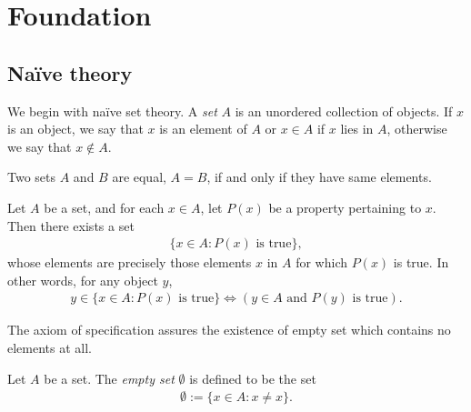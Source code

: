 
\chapter{Foundation}

\section{Na\"ive theory}

We begin with na\"ive set theory. A \emph{set} $A$ is an unordered collection of objects. If $x$ is an object, we say that $x$ is an element of $A$ or $x \in A$ if $x$ lies in $A$, otherwise we say that $x \notin A$.

\begin{axiom}
    Two sets $A$ and $B$ are equal, $A = B$, if and only if they have same elements.
\end{axiom}

\begin{axiom}
    Let $A$ be a set, and for each $x \in A$, let $P(x)$ be a property pertaining to $x$. Then there exists a set 
    \begin{align*}
        \{x \in A : P(x) \text{ is true}\},
    \end{align*}
    whose elements are precisely those elements $x$ in $A$ for which $P(x)$ is true. In other words, for any object $y$,
        \begin{align*}
            y \in \{x \in A : P(x) \text{ is true}\}
            \Longleftrightarrow 
            (y \in A \text{ and } P(y) \text{ is true}).
        \end{align*}
\end{axiom}

The axiom of specification assures the existence of empty set which contains no elements at all.

\begin{definition}
    Let $A$ be a set. The \emph{empty set} $\emptyset$ is defined to be the set
        \begin{align*}
            \emptyset := \{x \in A : x \neq x\}.
        \end{align*}
\end{definition}

